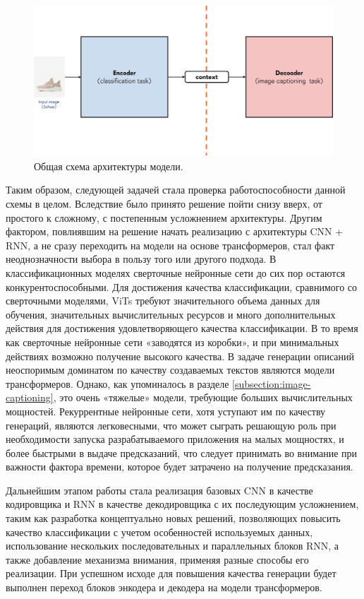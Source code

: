 \documentclass[a4paper,12pt]{extarticle}
\begin{document}
\begin{figure}[ht]
	\centering
	\includegraphics[scale=0.5]{general_encoderdecoder_scheme.png}
	\caption{Общая схема архитектуры модели.}
	\label{fig:general_encoderdecoder_scheme}
\end{figure}

Таким образом, следующей задачей стала проверка работоспособности данной схемы в целом. Вследствие было принято решение пойти снизу вверх, от простого к сложному, с постепенным усложнением архитектуры. Другим фактором, повлиявшим на решение начать реализацию с архитектуры CNN + RNN, а не сразу переходить на модели на основе трансформеров, стал факт неоднозначности выбора в пользу того или другого подхода. В классификационных моделях сверточные нейронные сети до сих пор остаются конкурентоспособными. Для достижения качества классификации, сравнимого со сверточными моделями, ViTs требуют значительного объема данных для обучения, значительных вычислительных ресурсов и много дополнительных действия для достижения удовлетворяющего качества классификации. В то время как сверточные нейронные сети «заводятся из коробки», и при минимальных действиях возможно получение высокого качества. В задаче генерации описаний неоспоримым доминатом по качеству создаваемых текстов являются модели трансформеров. Однако, как упоминалось в разделе \ref{subsection:image-captioning}, это очень «тяжелые» модели, требующие больших вычислительных мощностей. Рекуррентные нейронные сети, хотя уступают им по качеству генераций, являются легковесными, что может сыграть решающую роль при необходимости запуска разрабатываемого приложения на малых мощностях, и более быстрыми в выдаче предсказаний, что следует принимать во внимание при важности фактора времени, которое будет затрачено на получение предсказания.

Дальнейшим этапом работы стала реализация базовых CNN в качестве кодировщика и RNN в качестве декодировщика с их последующим усложнением, таким как разработка концептуально новых решений, позволяющих повысить качество классификации с учетом особенностей используемых данных, использование нескольких последовательных и параллельных блоков RNN, а также добавление механизма внимания, применяя разные способы его реализации. При успешном исходе для повышения качества генерации будет выполнен переход блоков энкодера и декодера на модели трансформеров.
\end{document}
